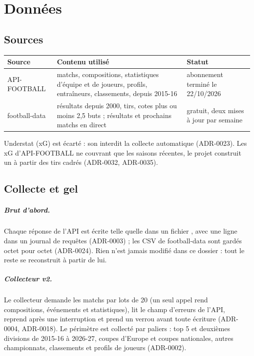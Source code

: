
\chapter{Données}
\label{chap:donnees}

\section{Sources}

\begin{center}
\begin{tabularx}{\textwidth}{lXl}
\toprule
Source & Contenu utilisé & Statut \\
\midrule
API-FOOTBALL & matchs, compositions, statistiques d'équipe et de joueurs, profils, entraîneurs,
               classements, depuis 2015-16 & abonnement terminé le 22/10/2026 \\
football-data & résultats depuis 2000, tirs, cotes plus ou moins 2,5 buts ; résultats et prochains
                matchs en direct & gratuit, deux mises à jour par semaine \\
\bottomrule
\end{tabularx}
\end{center}

Understat (xG) est écarté : son  interdit la collecte automatique (ADR-0023). Les xG
d'API-FOOTBALL ne couvrant que les saisons récentes, le projet construit un  à partir
des tirs cadrés (ADR-0032, ADR-0035).

\section{Collecte et gel}

\paragraph{Brut d'abord.} Chaque réponse de l'API est écrite telle quelle dans un fichier
, avec une ligne dans un journal de requêtes (ADR-0003) ; les CSV de football-data sont
gardés octet pour octet (ADR-0024). Rien n'est jamais modifié dans ce dossier : tout le reste se
reconstruit à partir de lui.

\paragraph{Collecteur v2.} Le collecteur demande les matchs par lots de 20 (un seul appel rend
compositions, événements et statistiques), lit le champ d'erreurs de l'API, reprend après une
interruption et prend un verrou avant toute écriture (ADR-0004, ADR-0018). Le périmètre est collecté
par paliers : top 5 et deuxièmes divisions de 2015-16 à 2026-27, coupes d'Europe et coupes nationales,
autres championnats, classements et profils de joueurs (ADR-0002).

